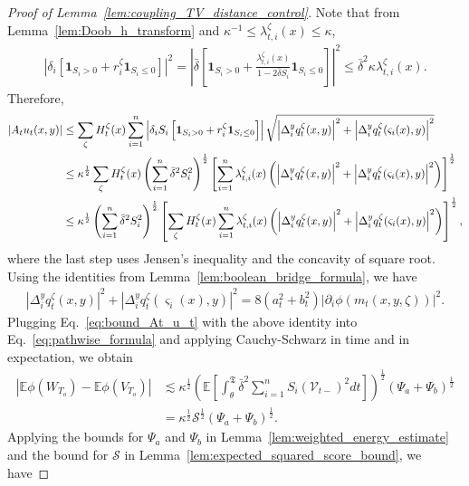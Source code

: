 \documentclass[11pt]{article}
\newcommand{\flip}{\varsigma}
\newcommand{\cS}{\mathcal{S}}
\newcommand{\btau}{\kappa}
\newcommand{\bdelta}{\bar{\delta}}
\newcommand{\stopT}{{\boldsymbol{\mathfrak{T}}}}
\newcommand{\uV}{V}
\newcommand{\uW}{W}
\newcommand{\To}{{T_o}}
\newcommand{\rV}{\mathscr{V}}
\theoremstyle{named}
\theoremstyle{plain}
\newcommand{\Exs}{\ensuremath{{\mathbb{E}}}}
\newcommand{\brackets}[1]{\left[ #1 \right]}
\newcommand{\parenth}[1]{\left( #1 \right)}
\newcommand{\abss}[1]{\left| #1 \right |}
\begin{document}
\begin{proof}[Proof of Lemma~\ref{lem:coupling_TV_distance_control}]
  Note that from Lemma~\ref{lem:Doob_h_transform} and $\btau^{-1} \leq \lambda_{t, i}^{\zeta}(x) \leq \btau$,
  \begin{align*}
    \abss{\delta_i \brackets{\mathbf{1}_{S_i > 0} + r_i^{\zeta} \mathbf{1}_{S_i \leq 0} }}^2 = \abss{\bdelta \brackets{\mathbf{1}_{S_i > 0} + \frac{\lambda_{t, i}^{\zeta}(x)}{1 - 2 \bdelta S_i} \mathbf{1}_{S_i \leq 0}}}^2
    \leq \bdelta^2 \btau  \lambda_{t, i}^{\zeta}(x).
  \end{align*}
  Therefore,
  \begin{align}
    \label{eq:bound_At_u_t}
    \abss{A_t u_t(x, y)} &\leq \sum_{\zeta} H_t^{\zeta}(x) \sum_{i=1}^n \abss{\delta_i S_i \brackets{\mathbf{1}_{S_i > 0} + r_i^{\zeta} \mathbf{1}_{S_i \leq 0} }} \sqrt{\abss{\Delta_i^y q_t^{\zeta}(x, y)}^2 + \abss{\Delta_i^y q_t^{\zeta}(\flip_i(x), y)}^2} \notag \\
    &\leq \btau^{\frac12} \sum_{\zeta} H_t^{\zeta}(x)  \parenth{\sum_{i=1}^n \bdelta^2 S_i^2}^{\frac12} \brackets{\sum_{i=1}^n \lambda_{t, i}^{\zeta}(x) \parenth{\abss{\Delta_i^y q_t^{\zeta}(x, y)}^2 + \abss{\Delta_i^y q_t^{\zeta}(\flip_i(x), y)}^2}  }^{\frac12} \notag \\
    &\leq \btau^{\frac12} \parenth{\sum_{i=1}^n \bdelta^2 S_i^2}^{\frac12} \brackets{ \sum_{\zeta} H_t^{\zeta}(x)  \sum_{i=1}^n \lambda_{t, i}^{\zeta}(x) \parenth{\abss{\Delta_i^y q_t^{\zeta}(x, y)}^2 + \abss{\Delta_i^y q_t^{\zeta}(\flip_i(x), y)}^2}  }^{\frac12},
  \end{align}
  where the last step uses Jensen's inequality and the concavity of square root.
  Using the identities from Lemma~\ref{lem:boolean_bridge_formula}, we have
  \begin{align*}
    \abss{\Delta_i^y q_t^{\zeta}(x, y)}^2 + \abss{\Delta_i^y q_t^{\zeta}(\flip_i(x), y)}^2 = 8 (a_t^2 + b_t^2) \abss{\partial_i \phi(m_{t}(x, y, \zeta))}^2.
  \end{align*}
  Plugging Eq.~\eqref{eq:bound_At_u_t} with the above identity into Eq.~\eqref{eq:pathwise_formula} and applying Cauchy-Schwarz in time and in expectation, we obtain
  \begin{align*}
    \abss{\Exs \phi(\uW_{\To}) - \Exs \phi(\uV_{\To})} &\lesssim \btau^{\frac12} \parenth{\Exs \brackets{\int_\theta^{\stopT} \bdelta^2 \sum_{i=1}^n S_i(\rV_{t-})^2 dt}}^{\frac12} \parenth{ \Psi_a + \Psi_b}^{\frac12} \\
    & = \btau^{\frac12} \cS^{\frac12} \parenth{ \Psi_a + \Psi_b}^{\frac12}.
  \end{align*}
  Applying the bounds for $\Psi_a$ and $\Psi_b$ in Lemma~\ref{lem:weighted_energy_estimate} and the bound for $\cS$ in Lemma~\ref{lem:expected_squared_score_bound}, we have

\end{proof}
\end{document}

